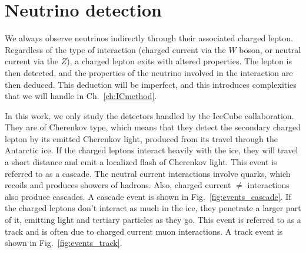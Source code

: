 % 
% 
\section{Neutrino detection}
We always observe neutrinos indirectly through their associated charged lepton. 
Regardless of the type of interaction (charged current via the $W$ boson, or neutral current
via the $Z$), a charged lepton exits with altered properties. The lepton is then detected, and the properties of the neutrino involved in the 
interaction are then deduced. This deduction will be imperfect, and this introduces complexities that we will handle in Ch.~\ref{ch:ICmethod}. 

In this work, we only study the detectors handled by the IceCube collaboration. They are of Cherenkov type, which means that they detect 
the secondary charged lepton by its emitted Cherenkov light, produced from its travel through the Antarctic ice. 
If the charged leptons interact heavily with the ice, they will travel a short distance and emit a localized flash of 
Cherenkov light. This event is referred to as a cascade. The neutral current interactions involve quarks, which recoils and produces
showers of hadrons. Also, charged current $\ne$ interactions also produce cascades. A cascade event 
is shown in Fig.~\ref{fig:events_cascade}.
If the charged leptons don't interact as much in the ice, they penetrate a larger part of it, emitting light and tertiary particles
as they go. This event is referred to as a track and is often due to charged current muon interactions. A track event 
is shown in Fig.~\ref{fig:events_track}.


